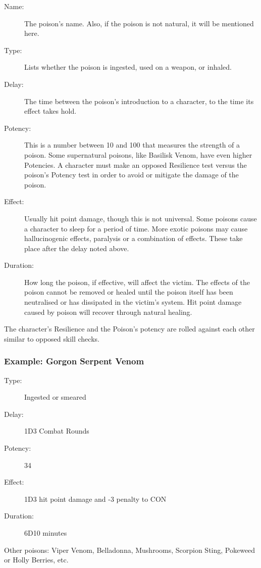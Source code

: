 \begin{description}
	\item[Name:] The poison’s name. Also, if the poison is not natural, it will be mentioned here. 
	\item[Type:] Lists whether the poison is ingested, used on a weapon, or inhaled. 
	\item[Delay:] The time between the poison’s introduction to a character, to the time its effect takes hold. 
	\item[Potency:] This is a number between 10 and 100 that measures the strength of a poison. Some supernatural poisons, like Basilisk Venom, have even higher Potencies. A character must make an opposed Resilience test versus the poison’s Potency test in order to avoid or mitigate the damage of the poison. 
	\item[Effect:] Usually hit point damage, though this is not universal. Some poisons cause a character to sleep for a period of time. More exotic poisons may cause hallucinogenic effects, paralysis or a combination of effects. These take place after the delay noted above. 
	\item[Duration:] How long the poison, if effective, will affect the victim. The effects of the poison cannot be removed or healed until the poison itself has been neutralised or has dissipated in the victim’s system. Hit point damage caused by poison will recover through natural healing. 
\end{description}

The character's Resilience and the Poison's potency are rolled against each other similar to opposed skill checks.

\subsubsection{Example: Gorgon Serpent Venom}

\begin{description}
\item[Type:] Ingested or smeared
\item[Delay:] 1D3 Combat Rounds
\item[Potency:] 34
\item[Effect:] 1D3 hit point damage and -3 penalty to CON
\item[Duration:] 6D10 minutes
\end{description}

Other poisons: Viper Venom, Belladonna, Mushrooms, Scorpion Sting, Pokeweed or Holly Berries, etc.

